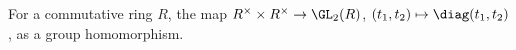 For a commutative ring $R$, the map $R^\times\times R^\times\to\GL_2(R)$, $(t_1,t_2)\mapsto\diag(t_1,t_2)$, as a group homomorphism.
